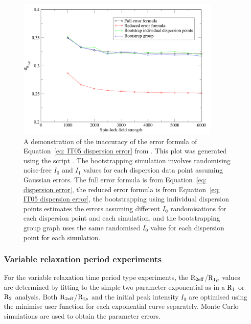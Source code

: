 \begin{figure}[h]
\label{fig: dispersion error comparison}
\centerline{\includegraphics[width=0.9\textwidth, bb=14 14 728 512]{graphics/analyses/dispersion/error_comparison}}
\caption[Comparison of relaxation dispersion errors]{A demonstration of the inaccuracy of the error formula of Equation~\ref{eq: IT05 dispersion error} from \citet{IshimaTorchia05}.  This plot was generated using the script .  The bootstrapping simulation involves randomising noise-free $I_0$ and $I_1$ values for each dispersion data point assuming Gaussian errors.  The full error formula is from Equation~\ref{eq: dispersion error}, the reduced error formula is from Equation~\ref{eq: IT05 dispersion error}, the bootstrapping using individual dispersion points estimates the errors assuming different $I_0$ randomisations for each dispersion point and each simulation, and the bootstrapping group graph uses the same randomised $I_0$ value for each dispersion point for each simulation.}
\end{figure}


\subsubsection{Variable relaxation period experiments}

For the variable relaxation time period type experiments, the $\mathrm{R}_{2\textrm{eff}}$/$\mathrm{R}_{1\rho}$ values are determined by fitting to the simple two parameter exponential as in a $\mathrm{R}_1$ or $\mathrm{R}_2$ analysis.  Both $\mathrm{R}_{2\textrm{eff}}$/$\mathrm{R}_{1\rho}$ and the initial peak intensity $I_0$ are optimised using the minimise user function for each exponential curve separately.  Monte Carlo simulations are used to obtain the parameter errors.




